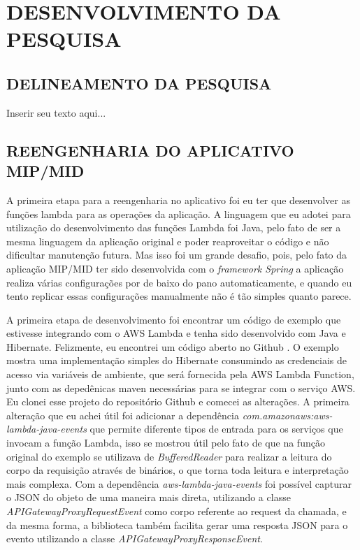 
\chapter{DESENVOLVIMENTO DA PESQUISA}
\label{chap:metodologia}


\section{DELINEAMENTO DA PESQUISA}
\label{sec:titSecDelPesq}

Inserir seu texto aqui...

\section{REENGENHARIA DO APLICATIVO MIP/MID}
\label{sec:titSecColDad}
A primeira etapa para a reengenharia no aplicativo foi eu ter que desenvolver as funções lambda para as operações da aplicação. A linguagem que eu adotei para utilização do desenvolvimento das funções Lambda foi Java, pelo fato de ser a mesma linguagem da aplicação original e poder reaproveitar o código e não dificultar manutenção futura. Mas isso foi um grande desafio, pois, pelo fato da aplicação MIP/MID ter sido desenvolvida com o \textit{framework Spring} a aplicação realiza várias configurações por de baixo do pano automaticamente, e quando eu tento replicar essas configurações manualmente não é tão simples quanto parece.

A primeira etapa de desenvolvimento foi encontrar um código de exemplo que estivesse integrando com o AWS Lambda e tenha sido desenvolvido com Java e Hibernate. Felizmente, eu encontrei um código aberto no Github \cite{githubExample}. O exemplo mostra uma implementação simples do Hibernate consumindo as credenciais de acesso via variáveis de ambiente, que será fornecida pela AWS Lambda Function, junto com as depedênicas maven necessárias para se integrar com o serviço AWS. Eu clonei esse projeto do repositório Github e comecei as alterações. A primeira alteração que eu achei útil foi adicionar a dependência \textit{com.amazonaws:aws-lambda-java-events} que permite diferente tipos de entrada para os serviços que invocam a função Lambda, isso se mostrou útil pelo fato de que na função original do exemplo se utilizava de \textit{BufferedReader} para realizar a leitura do corpo da requisição através de binários, o que torna toda leitura e interpretação mais complexa. Com a dependência \textit{aws-lambda-java-events} foi possível capturar o JSON do objeto de uma maneira mais direta, utilizando a classe \textit{APIGatewayProxyRequestEvent} como corpo referente ao request da chamada, e da mesma forma, a biblioteca também facilita gerar uma resposta JSON para o evento utilizando a classe \textit{APIGatewayProxyResponseEvent}.

